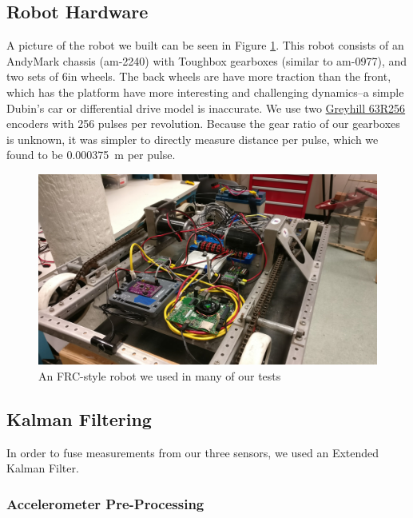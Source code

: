 \documentclass{article}
\begin{document}
	\subsection{Robot Hardware}

    A picture of the robot we built can be seen in Figure \ref{fig:mocap_robot}. This robot consists of an AndyMark chassis (am-2240) with Toughbox gearboxes (similar to am-0977), and two sets of 6in wheels. The back wheels are have more traction than the front, which has the platform have more interesting and challenging dynamics--a simple Dubin's car or differential drive model is inaccurate. We use two \href{https://www.digikey.com/product-detail/en/grayhill-inc/63R256/GH3070-ND/304479}{Greyhill 63R256} encoders with 256 pulses per revolution. Because the gear ratio of our gearboxes is unknown, it was simpler to directly measure distance per pulse, which we found to be \SI{0.000375}{\meter} per pulse.

    \begin{figure}[H]
      \centering
      \includegraphics[width=1\linewidth]{./images/mocap_robot.jpg}
      \caption{An FRC-style robot we used in many of our tests}
      \label{fig:mocap_robot}
    \end{figure}

	\subsection{Kalman Filtering}

    In order to fuse measurements from our three sensors, we used an Extended Kalman Filter.

    \subsubsection{Accelerometer Pre-Processing}
\end{document}
